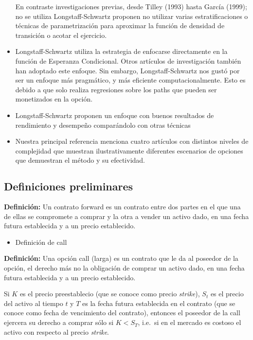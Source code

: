 \documentclass[12pt,reqno,letter]{article}
\providecommand{\tightlist}{%
	\setlength{\itemsep}{0pt}\setlength{\parskip}{0pt}}
\begin{document}
\begin{itemize}
		En contraste investigaciones previas, desde Tilley (1993) hasta García (1999); no se utiliza Longstaff-Schwartz proponen no utilizar varias estratificaciones o técnicas de parametrización para aproximar la función de densidad de transición o acotar el ejercicio.
		\item Longstaff-Schwartz utiliza la estrategia de enfocarse directamente en la función de Esperanza Condicional. Otros artículos de investigación también han adoptado este enfoque. Sin embargo, Longstaff-Schwartz nos gustó por ser un enfoque más pragmático, y más eficiente computacionalmente. Esto es debido a que solo realiza regresiones sobre los paths que pueden ser monetizados en la opción. 
		\item Longstaff-Schwartz proponen un enfoque con buenos resultados de rendimiento y desempeño comparándolo con otras técnicas
		\item Nuestra principal referencia menciona cuatro artículos con distintos niveles de complejidad que muestran ilustrativamente diferentes escenarios de opciones que demuestran el método y su efectividad.
	\end{itemize}

	\subsection{Definiciones preliminares}\label{definiciones-preliminares}
	
	\textbf{Definición:} Un contrato forward es un contrato entre dos partes
	en el que una de ellas se compromete a comprar y la otra a vender un
	activo dado, en una fecha futura establecida y a un precio establecido.
	
	\begin{itemize}
		\tightlist
		\item
		Definición de call
	\end{itemize}
	
	\textbf{Definición:} Una opción call (larga) es un contrato que le da al
	poseedor de la opción, el derecho más no la obligación de comprar un
	activo dado, en una fecha futura establecida y a un precio establecido.
	
	Si \(K\) es el precio preestablecio (que se conoce como precio
	\emph{strike}), \(S_t\) es el precio del activo al tiempo \(t\) y \(T\)
	es la fecha futura establecida en el contrato (que se conoce como fecha
	de vencimiento del contrato), entonces el poseedor de la call ejercera
	su derecho a comprar sólo si \(K < S_T\), i.e.~si en el mercado es
	costoso el activo con respecto al precio \emph{strike}.
	
\end{document}
